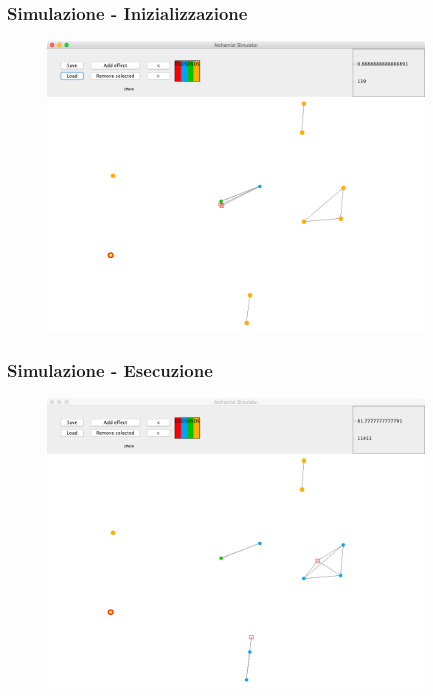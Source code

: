 \documentclass[handout]{beamer}\mode<presentation>{\usetheme{AMSCesenaBleu}}
\begin{document}
\begin{frame}
\frametitle{Simulazione - Inizializzazione}
\vspace*{-0.25cm}
\begin{figure}
\includegraphics[width=10cm]{images/simul_init.png}
\end{figure}
\end{frame}


\begin{frame}
\frametitle{Simulazione - Esecuzione}
\vspace*{-0.25cm}
\begin{figure}
\includegraphics[width=10cm]{images/simul_harvest2.png}
\end{figure}
\end{frame}
\end{document}
